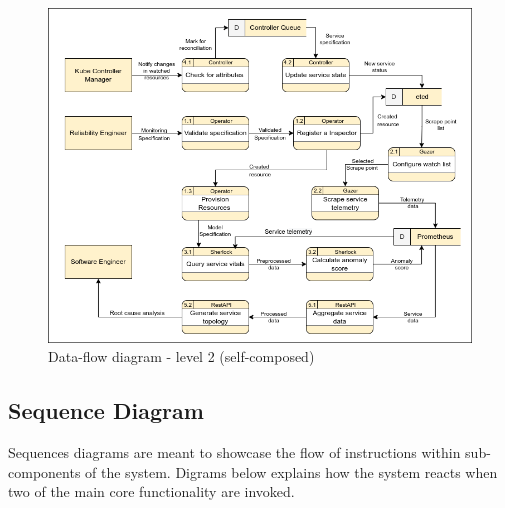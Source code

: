 \begin{figure}[H]
    \includegraphics[width=15cm]{assets/system-design/data-flow-level-2.png}
    \caption{Data-flow diagram - level 2 (self-composed)}
\end{figure}


\subsection{Sequence Diagram}

Sequences diagrams are meant to showcase the flow of instructions within sub-components of the system. Digrams below explains how the system reacts when two of the main core functionality are invoked.

